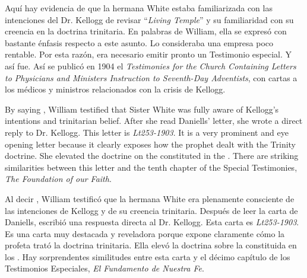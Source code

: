 Aquí hay evidencia de que la hermana White estaba familiarizada con las intenciones del Dr. Kellogg de revisar “\textit{Living Temple}” y su familiaridad con su creencia en la doctrina trinitaria. En palabras de William, ella se expresó con bastante énfasis respecto a este asunto. Lo consideraba una empresa poco rentable. Por esta razón, era necesario emitir pronto un Testimonio especial. Y así fue. Así se publicó en 1904 el \textit{Testimonies for the Church Containing Letters to Physicians and Ministers Instruction to Seventh-Day Adventists}, con cartas a los médicos y ministros relacionados con la crisis de Kellogg.


By saying , William testified that Sister White was fully aware of Kellogg's intentions and trinitarian belief. After she read Daniells’ letter, she wrote a direct reply to Dr. Kellogg. This letter is \textit{Lt253-1903}. It is a very prominent and eye opening letter because it clearly exposes how the prophet dealt with the Trinity doctrine. She elevated the doctrine on the  constituted in the . There are striking similarities between this letter and the tenth chapter of the Special Testimonies, \textit{The Foundation of our Faith}.


Al decir , William testificó que la hermana White era plenamente consciente de las intenciones de Kellogg y de su creencia trinitaria. Después de leer la carta de Daniells, escribió una respuesta directa al Dr. Kellogg. Esta carta es \textit{Lt253-1903}. Es una carta muy destacada y reveladora porque expone claramente cómo la profeta trató la doctrina trinitaria. Ella elevó la doctrina sobre la  constituida en los . Hay sorprendentes similitudes entre esta carta y el décimo capítulo de los Testimonios Especiales, \textit{El Fundamento de Nuestra Fe}.





% 
